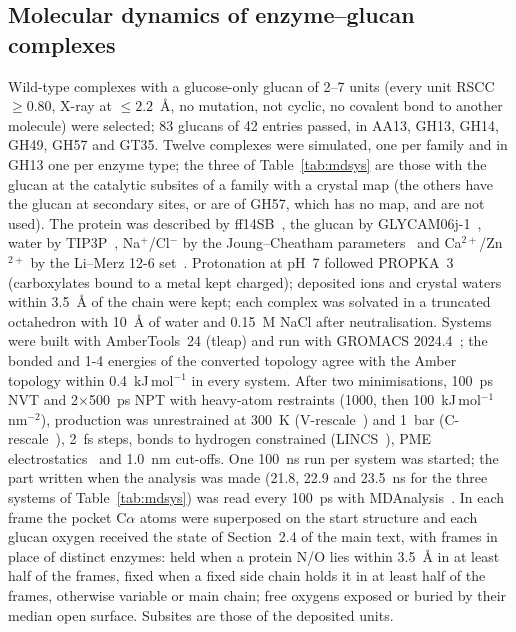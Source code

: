 \documentclass[preprint,12pt]{elsarticle}
\begin{document}
\subsection{Molecular dynamics of enzyme--glucan complexes}\label{sec:simd}
Wild-type complexes with a glucose-only glucan of 2--7 units (every unit RSCC $\ge0.80$, X-ray at
$\le2.2$~\AA, no mutation, not cyclic, no covalent bond to another molecule) were selected; 83 glucans of 42 entries
passed, in AA13, GH13, GH14, GH49, GH57 and GT35. Twelve complexes were simulated, one per family and in GH13 one per
enzyme type; the three of Table~\ref{tab:mdsys} are those with the glucan at the catalytic subsites of a family with a
crystal map (the others have the glucan at secondary sites, or are of GH57, which has no map, and are not used). The protein was described by
ff14SB~\citep{Maier2015}, the glucan by GLYCAM06j-1~\citep{kirschner2008}, water by TIP3P~\citep{Jorgensen1983},
Na$^+$/Cl$^-$ by the Joung--Cheatham parameters~\citep{Joung2008} and Ca$^{2+}$/Zn$^{2+}$ by the Li--Merz
12-6 set~\citep{Li2013}. Protonation at pH~7 followed PROPKA~3~\citep{Olsson2011} (carboxylates bound to a
metal kept charged); deposited ions and crystal waters within 3.5~\AA{} of the chain were kept; each
complex was solvated in a truncated octahedron with 10~\AA{} of water and 0.15~M NaCl after
neutralisation. Systems were built with AmberTools~24 (tleap) and run with GROMACS
2024.4~\citep{Abraham2015}; the bonded and 1-4 energies of the converted topology agree with the Amber
topology within 0.4~kJ\,mol$^{-1}$ in every system. After two minimisations, 100~ps NVT and
2$\times$500~ps NPT with heavy-atom restraints (1000, then 100~kJ\,mol$^{-1}$\,nm$^{-2}$), production was
unrestrained at 300~K (V-rescale~\citep{Bussi2007}) and 1~bar (C-rescale~\citep{Bernetti2020}), 2~fs steps,
bonds to hydrogen constrained (LINCS~\citep{Hess1997}), PME electrostatics~\citep{Essmann1995} and 1.0~nm
cut-offs. One 100~ns run per system was started; the part written when the analysis was made (21.8, 22.9
and 23.5~ns for the three systems of Table~\ref{tab:mdsys}) was read every 100~ps with MDAnalysis~\citep{MichaudAgrawal2011}. In each frame the
pocket C$\alpha$ atoms were superposed on the start structure and each glucan oxygen received the state of
Section~2.4 of the main text, with frames in place of distinct enzymes: held when a protein N/O lies within
3.5~\AA{} in at least half of the frames, fixed when a fixed side chain holds it in at least half of
the frames, otherwise variable or main chain; free oxygens exposed or buried by their median open surface. Subsites are those
of the deposited units.
\end{document}
